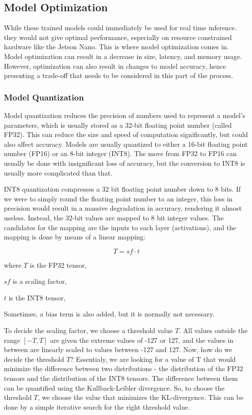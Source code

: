 \documentclass[12pt,letterpaper]{article}
\begin{document}
\subsection{Model Optimization}

While these trained models could immediately be used for real time inference. they would not give optimal performance, especially on resource constrained hardware like the Jetson Nano. This is where model optimization comes in. Model optimization can result in a decrease in size, latency, and memory usage. However, optimization can also result in changes to model accuracy, hence presenting a trade-off that needs to be considered in this part of the process.

\subsubsection{Model Quantization}

Model quantization reduces the precision of numbers used to represent a model's parameters, which is usually stored as a 32-bit floating point number (called FP32). This can reduce the size and speed of computation significantly, but could also affect accuracy. Models are usually quantized to either a 16-bit floating point number (FP16) or an 8-bit integer (INT8). The move from FP32 to FP16 can usually be done with insignificant loss of accuracy, but the conversion to INT8 is usually more complicated than that.

INT8 quantization compresses a 32 bit floating point number down to 8 bits. If we were to simply round the floating point number to an integer, this loss in precision would result in a massive degradation in accuracy, rendering it almost useless. Instead, the 32-bit values are mapped to 8 bit integer values. The candidates for the mapping are the inputs to each layer (activations), and the mapping is done by means of a linear mapping:

\[ T = sf \cdot t \]

where $T$ is the FP32 tensor,

$sf$ is a scaling factor,

$t$ is the INT8 tensor,

Sometimes, a bias term is also added, but it is normally not necessary.

To decide the scaling factor, we choose a threshold value $T$. All values outside the range $[-T,T]$ are given the extreme values of -127 or 127, and the values in between are linearly scaled to values between -127 and 127. Now, how do we decide the threshold $T$? Essentialy, we are looking for a value of T that would minimize the difference between two distributions - the distribution of the FP32 tensors and the distribution of the INT8 tensors. The difference between them can be quantified using the Kullback-Leibler divergence. So, to choose the threshold $T$, we choose the value that minimizes the KL-divergence. This can be done by a simple iterative search for the right threshold value. 
\end{document}
